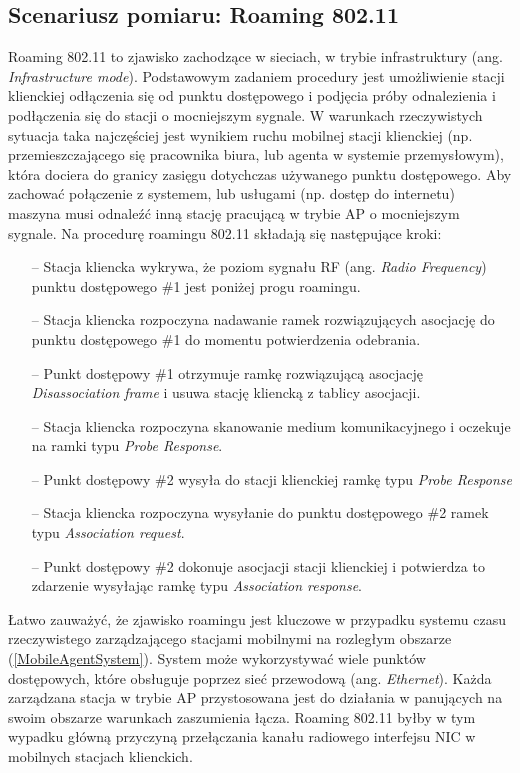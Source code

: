 \subsection{Scenariusz pomiaru: Roaming 802.11}
Roaming 802.11 to zjawisko zachodzące w sieciach, w trybie infrastruktury (ang. \emph{Infrastructure mode}). Podstawowym zadaniem procedury jest umożliwienie stacji klienckiej odłączenia się od punktu dostępowego i podjęcia próby odnalezienia i podłączenia się do stacji o mocniejszym sygnale. W warunkach rzeczywistych sytuacja taka najczęściej jest wynikiem ruchu mobilnej stacji klienckiej (np. przemieszczającego się pracownika biura, lub agenta w systemie przemysłowym), która dociera do granicy zasięgu dotychczas używanego punktu dostępowego. Aby zachować połączenie z systemem, lub usługami (np. dostęp do internetu) maszyna musi odnaleźć inną stację pracującą w trybie AP o mocniejszym sygnale. Na procedurę roamingu 802.11 składają się następujące kroki:
\begin{itemize}
\item[--] Stacja kliencka wykrywa, że poziom sygnału RF (ang. \emph{Radio Frequency})
punktu dostępowego \#1 jest poniżej progu roamingu.
\item[--] Stacja kliencka rozpoczyna nadawanie ramek rozwiązujących asocjację do punktu dostępowego \#1 do momentu potwierdzenia odebrania.
\item[--] Punkt dostępowy \#1 otrzymuje ramkę rozwiązującą asocjację \emph{Disassociation frame} i usuwa stację kliencką z tablicy asocjacji.
\item[--] Stacja kliencka rozpoczyna skanowanie medium komunikacyjnego i oczekuje na ramki typu \emph{Probe Response}.
\item[--] Punkt dostępowy \#2 wysyła do stacji klienckiej ramkę typu \emph{Probe Response}
\item[--] Stacja kliencka rozpoczyna wysyłanie do punktu dostępowego \#2 ramek typu \emph{Association request}.
\item[--] Punkt dostępowy \#2 dokonuje asocjacji stacji klienckiej i potwierdza to zdarzenie wysyłając ramkę typu \emph{Association response}.
\end{itemize}

Łatwo zauważyć, że zjawisko roamingu jest kluczowe w przypadku systemu czasu rzeczywistego zarządzającego stacjami mobilnymi na rozległym obszarze (\ref{MobileAgentSystem}). System może wykorzystywać wiele punktów dostępowych, które obsługuje poprzez sieć przewodową (ang. \emph{Ethernet}). Każda zarządzana stacja w trybie AP przystosowana jest do działania w panujących na swoim obszarze warunkach zaszumienia łącza. Roaming 802.11 byłby w tym wypadku główną przyczyną przełączania kanału radiowego interfejsu NIC w mobilnych stacjach klienckich. 

